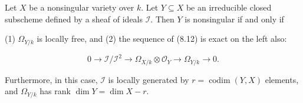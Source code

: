 Let $X$ be a nonsingular variety over $k$. Let $Y \subseteq X$ be an irreducible closed subscheme defined by a sheaf of ideals $\mathcal{I}$. Then $Y$ is nonsingular if and only if

(1) $\Omega_{Y/k}$ is locally free, and
(2) the sequence of (8.12) is exact on the left also:

$$0 \to \mathcal{I}/\mathcal{I}^2 \to \Omega_{X/k} \otimes \mathcal{O}_Y \to \Omega_{Y/k} \to 0.$$

Furthermore, in this case, $\mathcal{I}$ is locally generated by $r = \operatorname{codim}(Y, X)$ elements, and $\Omega_{Y/k}$ has rank $\dim Y = \dim X - r$.
